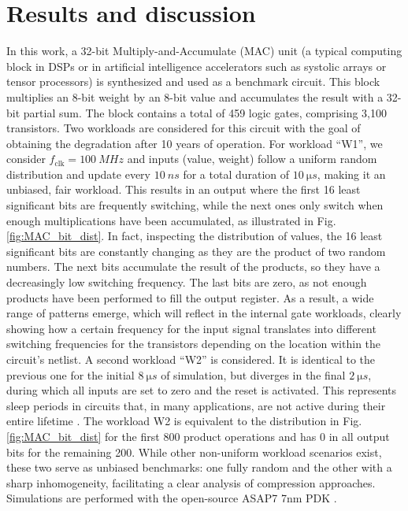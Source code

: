 \section{Results and discussion}
\label{section:Results}

In this work, a 32-bit Multiply-and-Accumulate (MAC) unit (a typical computing block in DSPs or in artificial intelligence accelerators such as systolic arrays or tensor processors) is synthesized and used as a benchmark circuit. This block multiplies an 8-bit weight by an 8-bit value and accumulates the result with a 32-bit partial sum. The block contains a total of 459 logic gates, comprising 3,100 transistors. Two workloads are considered for this circuit with the goal of obtaining the degradation after 10 years of operation. For workload ``W1'', we consider $f_\text{clk} = \qty{100}{MHz}$ and inputs (value, weight) follow a uniform random distribution and update every $\qty{10}{ns}$ for a total duration of $\qty{10}{\micro s}$, making it an unbiased, fair workload. This results in an output where the first 16 least significant bits are frequently switching, while the next ones only switch when enough multiplications have been accumulated, as illustrated in Fig. \ref{fig:MAC_bit_dist}. In fact, inspecting the distribution of values, the 16 least significant bits are constantly changing as they are the product of two random numbers. The next bits accumulate the result of the products, so they have a decreasingly low switching frequency. The last bits are zero, as not enough products have been performed to fill the output register. As a result, a wide range of patterns emerge, which will reflect in the internal gate workloads, clearly showing how a certain frequency for the input signal translates into different switching frequencies for the transistors depending on the location within the circuit's netlist. A second workload ``W2'' is considered. It is identical to the previous one for the initial $\qty{8}{\micro s}$ of simulation, but diverges in the final $\qty{2}{\micro s}$, during which all inputs are set to zero and the reset is activated. This represents sleep periods in circuits that, in many applications, are not active during their entire lifetime \cite{duchAnalysisFunctionalErrors2020}. The workload W2 is equivalent to the distribution in Fig. \ref{fig:MAC_bit_dist} for the first 800 product operations and has 0 in all output bits for the remaining 200. While other non-uniform workload scenarios exist, these two serve as unbiased benchmarks: one fully random and the other with a sharp inhomogeneity, facilitating a clear analysis of compression approaches. Simulations are performed with the open-source ASAP7 7nm PDK \cite{vashishthaASAP7PredictiveDesign2017}.

